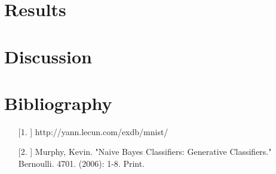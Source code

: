 \documentclass[twocolumn]{article}
\begin{document}
\section{Results} %
\label{sec:results}

\section{Discussion} %
\label{sec:discussion}

\section{Bibliography} %
\label{sec:bibliography}
\begin{enumerate}
\item[[1.]] http://yann.lecun.com/exdb/mnist/
\item[[2.]] Murphy, Kevin. "Naive Bayes Classifiers: Generative Classifiers." Bernoulli. 4701. (2006): 1-8. Print.
\end{enumerate}


\end{document}
